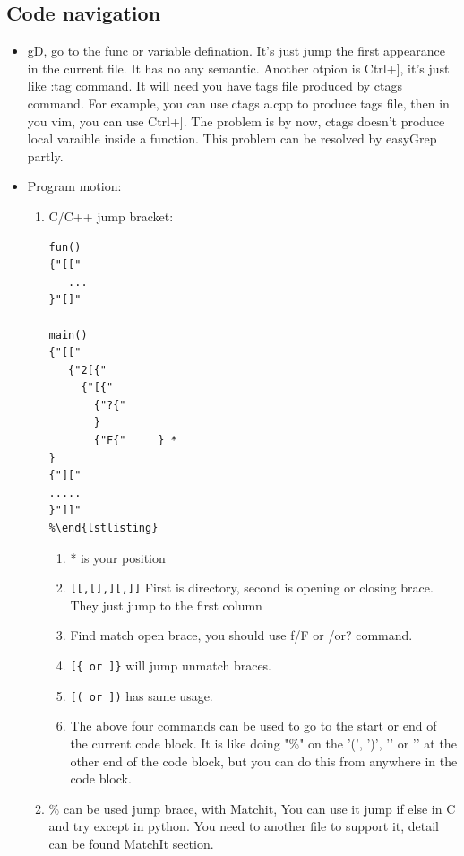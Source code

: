 \documentclass[a4paper,12pt,twoside]{book}
\begin{document}
\subsection{Code navigation}
\begin{itemize}
	\item gD, go to the func or variable defination. It's just jump the first appearance in the current file. It has no any semantic. Another otpion is Ctrl+], it's just like :tag command. It will need you have tags file produced by ctags command. For example, you can use ctags a.cpp to produce tags file, then in you vim, you can use Ctrl+]. The problem is by now, ctags doesn't produce local varaible inside a function.  This problem can be resolved by easyGrep partly.

	\item  Program motion:
\begin{enumerate}
 	\item C/C++ jump bracket:
\begin{verbatim}
fun()
{"[["
   ...
}"[]"

main()
{"[["
   {"2[{"
	 {"[{" 
	   {"?{"
	   }
	   {"F{"     } *
}
{"]["
.....
}"]]"
%\end{lstlisting}
\end{verbatim}
\begin{enumerate}
		\item * is your position
		\item \verb=[[,[],][,]]= First is directory, second is opening or closing brace. They just jump to the first column
		\item Find match open brace, you should use f/F or /or? command. 
		\item \verb=[{ or ]}= will jump unmatch braces. 
		\item \verb=[( or ])= has same usage.

		\item The above four commands can be used to go to the start or end of the current code block.  It is like doing "\%" on the '(', ')', '{' or '}' at the other end of the code block, but you can do this from anywhere in the code block.
\end{enumerate}

\item \% can be used jump brace, with Matchit, You can use it jump if else in C and try except in python. You need to another file to support it, detail can be found MatchIt section. 


\end{enumerate}
\end{itemize}
\end{document}
